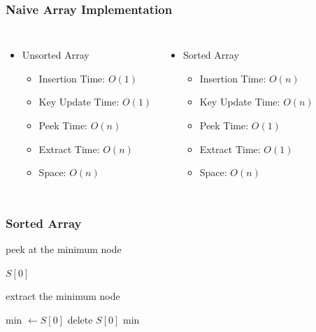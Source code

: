 \documentclass[a4paper]{beamer}
\begin{document}
\begin{frame}
	\frametitle{Naive Array Implementation} 
	\begin{columns}
	\begin{itemize}
		\item Unsorted Array
		\begin{itemize}
			\item Insertion Time: \( O(1) \) 			
			\item Key Update Time: \( O(1) \) 
			\item Peek Time: \( O(n) \) 
			\item Extract Time: \( O(n) \) 
			\item Space: \( O(n) \) 
		\end{itemize}
	\end{itemize}
	
	\begin{itemize}
		\item Sorted Array
		\begin{itemize}
			\item Insertion Time: \( O(n) \) 
			\item Key Update Time: \( O(n) \) 
			\item Peek Time: \( O(1) \) 
			\item Extract Time: \( O(1) \) 
			\item Space: \( O(n) \) 
		\end{itemize}
	\end{itemize}
	\end{columns}
\end{frame}

\begin{frame}
	\frametitle{Sorted Array}
	\begin{algorithm}[H]
		\caption{peek at the minimum node}
		\begin{algorithmic}[1]
			\State \Return $S[0]$
		\EndFunction
		\end{algorithmic}
	\end{algorithm}

	\begin{algorithm}[H]
		\caption{extract the minimum node}
		\begin{algorithmic}[1]
		\State min \( \leftarrow S[0]\) 
		\State delete $S[0]$
		\State \Return min
		\EndFunction
		\end{algorithmic}
	\end{algorithm}
\end{frame}
\end{document}
